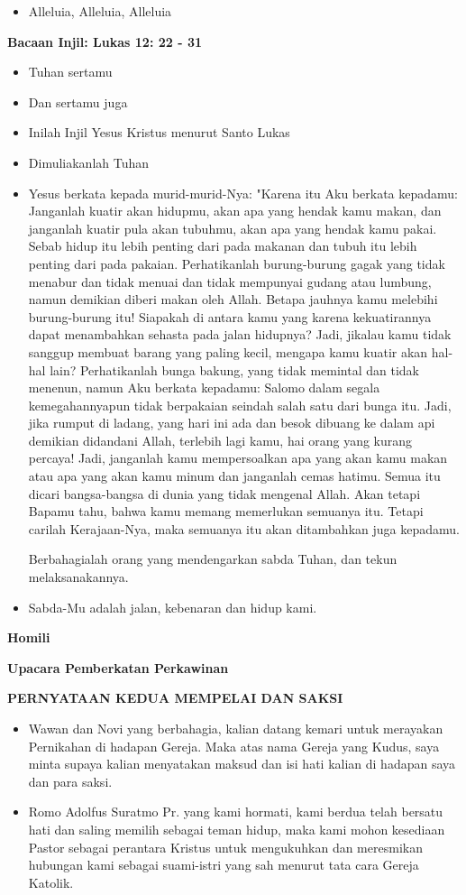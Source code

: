 \documentclass[10pt]{book}
\makeatletter
\newcommand{\judul}[1]{%
  {\parindent \z@ \centering \normalfont
    \interlinepenalty\@M \Large \bfseries #1\par\nobreak \vskip 20\p@ }}
\newcommand{\subjudul}[1]{%
  {\parindent \z@ \normalfont
    \interlinepenalty\@M \bfseries #1\par\nobreak \vskip 20\p@ }}
\newcommand{\BU}[1]{\begin{itemize} \item[U:] #1 \end{itemize}}
\newcommand{\BI}[1]{\begin{itemize} \item[I:] #1 \end{itemize}}
\newcommand{\BMP}[1]{\begin{itemize} \item[W+N:] #1 \end{itemize}}
\newcommand{\romo}{Adolfus Suratmo Pr. }
\makeatother
\begin{document}
\BU{Alleluia, Alleluia, Alleluia} 

\subjudul{Bacaan Injil: Lukas 12: 22 - 31}

\BI{Tuhan sertamu}

\BU{Dan sertamu juga}

\BI{Inilah Injil Yesus Kristus menurut Santo Lukas}

\BU{Dimuliakanlah Tuhan}

\BI{Yesus berkata kepada murid-murid-Nya: "Karena itu Aku berkata kepadamu: Janganlah kuatir akan hidupmu, akan apa yang hendak kamu makan, dan janganlah kuatir pula akan tubuhmu, akan apa yang hendak kamu pakai.
Sebab hidup itu lebih penting dari pada makanan dan tubuh itu lebih penting dari pada pakaian.
Perhatikanlah burung-burung gagak yang tidak menabur dan tidak menuai dan tidak mempunyai gudang atau lumbung, namun demikian diberi makan oleh Allah. Betapa jauhnya kamu melebihi burung-burung itu!
Siapakah di antara kamu yang karena kekuatirannya dapat menambahkan sehasta pada jalan hidupnya?
Jadi, jikalau kamu tidak sanggup membuat barang yang paling kecil, mengapa kamu kuatir akan hal-hal lain?
Perhatikanlah bunga bakung, yang tidak memintal dan tidak menenun, namun Aku berkata kepadamu: Salomo dalam segala kemegahannyapun tidak berpakaian seindah salah satu dari bunga itu.
Jadi, jika rumput di ladang, yang hari ini ada dan besok dibuang ke dalam api demikian didandani Allah, terlebih lagi kamu, hai orang yang kurang percaya!
Jadi, janganlah kamu mempersoalkan apa yang akan kamu makan atau apa yang akan kamu minum dan janganlah cemas hatimu.
Semua itu dicari bangsa-bangsa di dunia yang tidak mengenal Allah. Akan tetapi Bapamu tahu, bahwa kamu memang memerlukan semuanya itu.
Tetapi carilah Kerajaan-Nya, maka semuanya itu akan ditambahkan juga kepadamu.

Berbahagialah orang yang mendengarkan sabda Tuhan, dan tekun melaksanakannya.}

\BU{Sabda-Mu adalah jalan, kebenaran dan hidup kami.}

\subjudul{Homili}

\judul{Upacara Pemberkatan Perkawinan}

\subjudul{PERNYATAAN KEDUA MEMPELAI DAN SAKSI}

\BI{Wawan dan Novi yang berbahagia, kalian datang kemari untuk merayakan Pernikahan di hadapan Gereja.  Maka atas nama Gereja yang Kudus, saya minta supaya kalian menyatakan maksud dan isi hati kalian di hadapan saya dan para saksi.}

\BMP{Romo \romo yang kami hormati, kami berdua telah bersatu hati dan saling memilih sebagai teman hidup, maka kami mohon kesediaan Pastor sebagai perantara Kristus untuk mengukuhkan dan meresmikan hubungan kami sebagai suami-istri yang sah menurut tata cara Gereja Katolik.}
\end{document}
